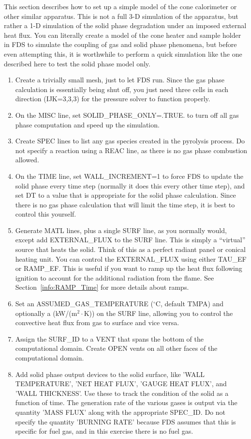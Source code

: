 \documentclass[11pt]{book}
\begin{document}
This section describes how to set up a simple model of the cone calorimeter or other similar apparatus. This is not a full 3-D simulation of the apparatus, but rather a 1-D simulation of the solid phase degradation under an imposed external heat flux. You can literally create a model of the cone heater and sample holder in FDS to simulate the coupling of gas and solid phase phenomena, but before even attempting this, it is worthwhile to perform a quick simulation like the one described here to test the solid phase model only.
\begin{enumerate}
\item Create a trivially small mesh, just to let FDS run. Since the gas phase calculation is essentially being shut off, you just need three cells in each direction ({\ct IJK=3,3,3}) for the pressure solver to function properly.
\item On the {\ct MISC} line, set {\ct SOLID\_PHASE\_ONLY=.TRUE.} to turn off all gas phase computation and speed up the simulation.
\item Create {\ct SPEC} lines to list any gas species created in the pyrolysis process. Do not specify a reaction using a {\ct REAC} line, as there is no gas phase combustion allowed.
\item On the {\ct TIME} line, set {\ct WALL\_INCREMENT=1} to force FDS to update the solid phase every time step (normally it does this every other time step), and set {\ct DT} to a value that is appropriate for the solid phase calculation. Since there is no gas phase calculation that will limit the time step, it is best to control this yourself.
\item Generate {\ct MATL} lines, plus a single {\ct SURF} line, as you normally would, except add {\ct EXTERNAL\_FLUX} to the {\ct SURF} line. This is simply a ``virtual'' source that heats the solid. Think of this as a perfect radiant panel or conical heating unit. You can control the {\ct EXTERNAL\_FLUX} using either {\ct TAU\_EF} or {\ct RAMP\_EF}. This is useful if you want to ramp up the heat flux following ignition to account for the additional radiation from the flame. See Section~\ref{info:RAMP_Time} for more details about ramps.
\item Set an {\ct ASSUMED\_GAS\_TEMPERATURE} ($^\circ$C, default {\ct TMPA}) and optionally a  (kW/(m$^2 \cdot$K)) on the {\ct SURF} line, allowing you to control the convective heat flux from gas to surface and vice versa.
\item Assign the {\ct SURF\_ID} to a {\ct VENT} that spans the bottom of the computational domain. Create {\ct OPEN} vents on all other faces of the computational domain.
\item Add solid phase output devices to the solid surface, like {\ct 'WALL TEMPERATURE'}, {\ct 'NET HEAT FLUX'}, {\ct 'GAUGE HEAT FLUX'}, and {\ct 'WALL THICKNESS'}. Use these to track the condition of the solid as a function of time. The generation rate of the various gases is output via the quantity {\ct 'MASS FLUX'} along with the appropriate {\ct SPEC\_ID}. Do not specify the quantity {\ct 'BURNING RATE'} because FDS assumes that this is specific for fuel gas, and in this exercise there is no fuel gas.
\end{enumerate}
\end{document}
